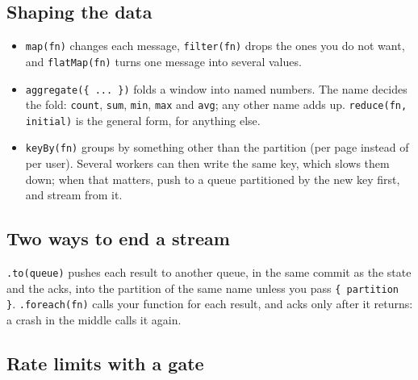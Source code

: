 
\subsection{Shaping the data}

\begin{itemize}
\item \texttt{map(fn)} changes each message, \texttt{filter(fn)} drops the ones you do not want,
and \texttt{flatMap(fn)} turns one message into several values.
\item \texttt{aggregate(\{ ... \})} folds a window into named numbers. The name decides the fold:
\texttt{count}, \texttt{sum}, \texttt{min}, \texttt{max} and \texttt{avg}; any other name adds up.
\texttt{reduce(fn, initial)} is the general form, for anything else.
\item \texttt{keyBy(fn)} groups by something other than the partition (per page instead of per user).
Several workers can then write the same key, which slows them down; when that matters, push to a
queue partitioned by the new key first, and stream from it.
\end{itemize}


\subsection{Two ways to end a stream}

\texttt{.to(queue)} pushes each result to another queue, in the same commit as the state and the
acks, into the partition of the same name unless you pass \texttt{\{ partition \}}.
\texttt{.foreach(fn)} calls your function for each result, and acks only after it returns: a crash
in the middle calls it again.


\subsection{Rate limits with a gate}

